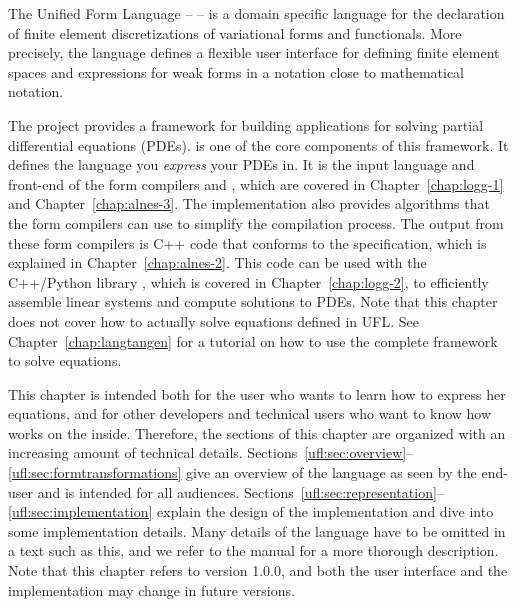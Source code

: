 
The Unified Form Language -- \ufl{} \citep{AlnaesLogg2009} --
is a domain specific language for the declaration of finite element
discretizations of variational forms and functionals. More precisely,
the language defines a flexible user interface for defining finite
element spaces and expressions for weak forms in a notation close to
mathematical notation.

The \fenics{} project provides a framework for building applications
for solving partial differential equations (PDEs).  \ufl{} is one of
the core components of this framework.  It defines the language you
\emph{express} your PDEs in.  It is the input language and front-end
of the form compilers \ffc{} and \sfc{}, which are covered in
Chapter~\ref{chap:logg-1} and Chapter~\ref{chap:alnes-3}.  The \ufl{}
implementation also provides algorithms that the form compilers can
use to simplify the compilation process.  The output from these form
compilers is C++ \citep{Stroustrup1997} code that conforms to the \ufc{}
specification, which is explained in Chapter~\ref{chap:alnes-2}.
This code can be used with the C++/Python library \dolfin{}, which
is covered in Chapter~\ref{chap:logg-2}, to efficiently assemble
linear systems and compute solutions to PDEs.  Note that this chapter
does not cover how to actually solve equations defined in UFL. See
Chapter~\ref{chap:langtangen} for a tutorial on how to use the complete
\fenics{} framework to solve equations.

This chapter is intended both for the \fenics{} user who wants to
learn how to express her equations, and for other \fenics{} developers
and technical users who want to know how \ufl{} works on the inside.
Therefore, the sections of this chapter are organized with an
increasing amount of technical details.
Sections~\ref{ufl:sec:overview}--\ref{ufl:sec:formtransformations}
give an overview of the language as seen by the end-user and is
intended for all audiences.
Sections~\ref{ufl:sec:representation}--\ref{ufl:sec:implementation}
explain the design of the implementation and dive into some
implementation details.  Many details of the language have to be
omitted in a text such as this, and we refer to the \ufl{} manual
\citep{AlnaesLogg2009} for a more thorough description. Note that this
chapter refers to \ufl{} version 1.0.0, and both the user interface
and the implementation may change in future versions.

